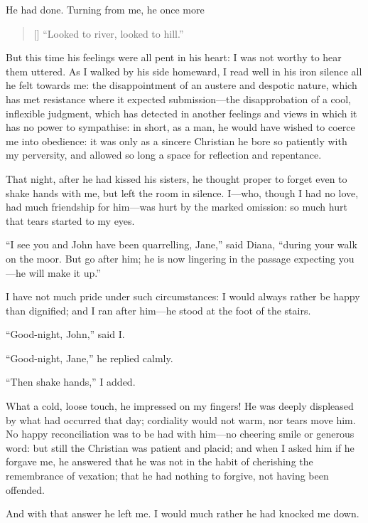 He had done. Turning from me, he once more

\begin{verse}[\versewidth]
	\enquote{Looked to river, looked to hill.}
\end{verse}

But this time his feelings were all pent in his heart: I was not worthy
to hear them uttered. As I walked by his side homeward, I read well in
his iron silence all he felt towards me: the disappointment of an
austere and despotic nature, which has met resistance where it expected
submission---the disapprobation of a cool, inflexible judgment, which
has detected in another feelings and views in which it has no power to
sympathise: in short, as a man, he would have wished to coerce me into
obedience: it was only as a sincere Christian he bore so patiently with
my perversity, and allowed so long a space for reflection and
repentance.

That night, after he had kissed his sisters, he thought proper to forget
even to shake hands with me, but left the room in silence. I---who,
though I had no love, had much friendship for him---was hurt by the
marked omission: so much hurt that tears started to my eyes.

\enquote{I see you and \St{} John have been quarrelling, Jane,} said
Diana, \enquote{during your walk on the moor. But go after him; he is
	now lingering in the passage expecting you---he will make it up.}

I have not much pride under such circumstances: I would always rather be
happy than dignified; and I ran after him---he stood at the foot of the
stairs.

\enquote{Good-night, \St{} John,} said I\@.

\enquote{Good-night, Jane,} he replied calmly.

\enquote{Then shake hands,} I added.

What a cold, loose touch, he impressed on my fingers! He was deeply
displeased by what had occurred that day; cordiality would not warm, nor
tears move him. No happy reconciliation was to be had with him---no
cheering smile or generous word: but still the Christian was patient and
placid; and when I asked him if he forgave me, he answered that he was
not in the habit of cherishing the remembrance of vexation; that he had
nothing to forgive, not having been offended.

And with that answer he left me. I would much rather he had knocked me
down.
